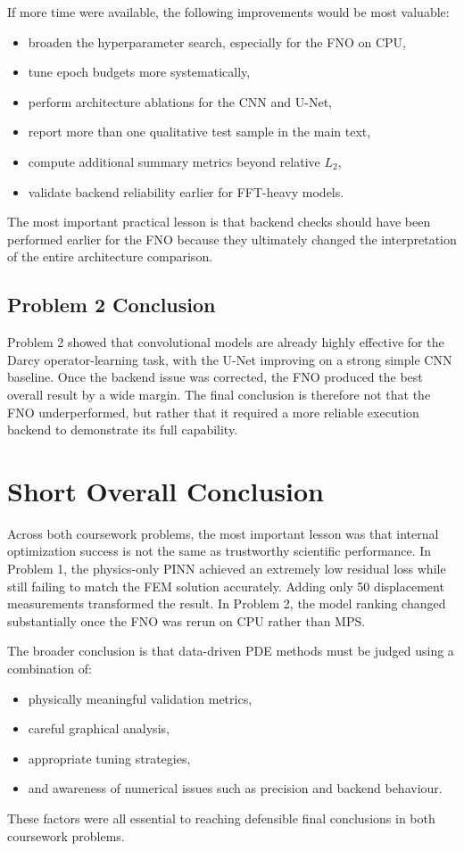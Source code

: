 \documentclass[11pt]{article}
\begin{document}
If more time were available, the following improvements would be most valuable:
\begin{itemize}[itemsep=0.25em]
    \item broaden the hyperparameter search, especially for the FNO on CPU,
    \item tune epoch budgets more systematically,
    \item perform architecture ablations for the CNN and U-Net,
    \item report more than one qualitative test sample in the main text,
    \item compute additional summary metrics beyond relative \(L_2\),
    \item validate backend reliability earlier for FFT-heavy models.
\end{itemize}

The most important practical lesson is that backend checks should have been performed earlier for the FNO because they ultimately changed the interpretation of the entire architecture comparison.

\subsection*{Problem 2 Conclusion}

Problem 2 showed that convolutional models are already highly effective for the Darcy operator-learning task, with the U-Net improving on a strong simple CNN baseline. Once the backend issue was corrected, the FNO produced the best overall result by a wide margin. The final conclusion is therefore not that the FNO underperformed, but rather that it required a more reliable execution backend to demonstrate its full capability.

\section*{Short Overall Conclusion}

Across both coursework problems, the most important lesson was that internal optimization success is not the same as trustworthy scientific performance. In Problem 1, the physics-only PINN achieved an extremely low residual loss while still failing to match the FEM solution accurately. Adding only 50 displacement measurements transformed the result. In Problem 2, the model ranking changed substantially once the FNO was rerun on CPU rather than MPS.

The broader conclusion is that data-driven PDE methods must be judged using a combination of:
\begin{itemize}[itemsep=0.25em]
    \item physically meaningful validation metrics,
    \item careful graphical analysis,
    \item appropriate tuning strategies,
    \item and awareness of numerical issues such as precision and backend behaviour.
\end{itemize}

These factors were all essential to reaching defensible final conclusions in both coursework problems.
\end{document}

